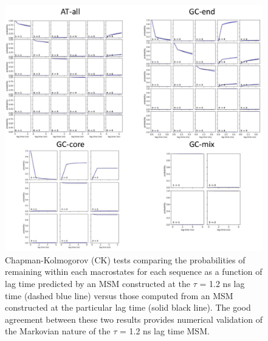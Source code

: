 \documentclass[journal=jpcbfk,manuscript=article]{achemso}
\begin{document}
\begin{figure}[ht!]
	\begin{center}
        \includegraphics[width=1.0\textwidth]{FigS3.pdf}
        \caption{Chapman-Kolmogorov (CK) tests comparing the probabilities of remaining within each macrostates for each sequence as a function of lag time predicted by an MSM constructed at the $\tau$ = 1.2 ns lag time (dashed blue line) versus those computed from an MSM constructed at the particular lag time (solid black line). The good agreement between these two results provides numerical validation of the Markovian nature of the $\tau$ = 1.2 ns lag time MSM.}
        \label{fig:SIFig3}
	\end{center}
\end{figure}

\clearpage
\newpage
\end{document}
